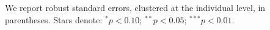 \begin{table}[htbp]
\begin{threeparttable}
\begin{tablenotes}
{%
We report robust standard errors, clustered at the individual level, in parentheses. Stars denote: $^{*} p<0.10$; $^{**} p<0.05$; $^{***} p<0.01$.} \end{tablenotes} \end{threeparttable} \end{table}
